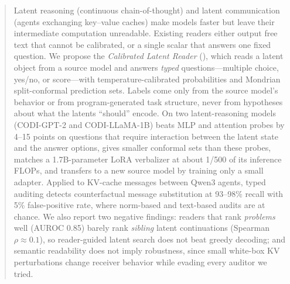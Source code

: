 \begin{abstract}
Latent reasoning (continuous chain-of-thought) and latent communication (agents exchanging key--value caches) make models faster but leave their intermediate computation unreadable. Existing readers either output free text that cannot be calibrated, or a single scalar that answers one fixed question. We propose the \emph{Calibrated Latent Reader} (\clr{}), which reads a latent object from a source model and answers \emph{typed} questions---multiple choice, yes/no, or score---with temperature-calibrated probabilities and Mondrian split-conformal prediction sets. Labels come only from the source model's behavior or from program-generated task structure, never from hypotheses about what the latents ``should'' encode. On two latent-reasoning models (CODI-GPT-2 and CODI-LLaMA-1B) \clr{} beats MLP and attention probes by 4--15 points on questions that require interaction between the latent state and the answer options, gives smaller conformal sets than these probes, matches a 1.7B-parameter LoRA verbalizer at about 1/500 of its inference FLOPs, and transfers to a new source model by training only a small adapter. Applied to KV-cache messages between Qwen3 agents, typed auditing detects counterfactual message substitution at 93--98\% recall with 5\% false-positive rate, where norm-based and text-based audits are at chance. We also report two negative findings: readers that rank \emph{problems} well (AUROC 0.85) barely rank \emph{sibling} latent continuations (Spearman $\rho\approx0.1$), so reader-guided latent search does not beat greedy decoding; and semantic readability does not imply robustness, since small white-box KV perturbations change receiver behavior while evading every auditor we tried.
\end{abstract}

